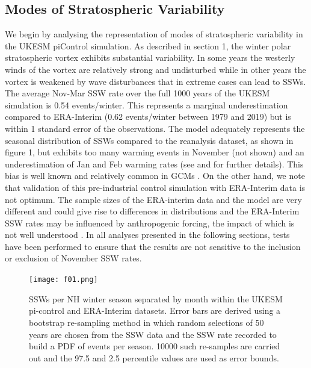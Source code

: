 \subsection{Modes of Stratospheric Variability}
\label{sec:strat_var_UKESM}
We begin by analysing the representation of modes of stratospheric variability in the UKESM piControl simulation. As described in section 1, the winter polar stratospheric vortex  exhibits substantial variability. In some years the westerly winds of the vortex are relatively strong and undisturbed while in other years the vortex is weakened by wave disturbances that in extreme cases can lead to SSWs. The average Nov-Mar SSW rate over the full 1000 years of the UKESM simulation is 0.54 events/winter. This represents a marginal underestimation compared to ERA-Interim (0.62 events/winter between 1979 and 2019) but is within 1 standard error of the observations. The model adequately represents the seasonal distribution of SSWs compared to the reanalysis dataset, as shown in figure 1, but exhibits too many warming events in November (not shown) and an underestimation of Jan and Feb warming rates (see \cite{Andrews2020} and \cite{Menary2018} for further details). This bias is well known and relatively common in GCMs \citep{Charlton2007, Ayarz2020}. On the other hand, we note that validation of this pre-industrial control simulation with ERA-Interim data is not optimum. The sample sizes of the ERA-interim data and the model are very different and could give rise to differences in distributions \citep{Horan2017} and the ERA-Interim SSW rates may be influenced by anthropogenic forcing, the impact of which is not well understood \citep{Ayarz2020}. In all analyses presented in the following sections, tests have been performed to ensure that the results are not sensitive to the inclusion or exclusion of November SSW rates. 

\begin{center}
\begin{figure}[h!]
\noindent\texttt{[image: f01.png]}
\caption{SSWs per NH winter season separated by month within the UKESM pi-control and ERA-Interim datasets. Error bars are derived using a bootstrap re-sampling method in which random selections of 50 years are chosen from the SSW data and the SSW rate recorded to build a PDF of events per season. 10000 such re-samples are carried out and the 97.5 and 2.5 percentile values are used as error bounds.}
\label{fig1}
\end{figure}
\end{center}

